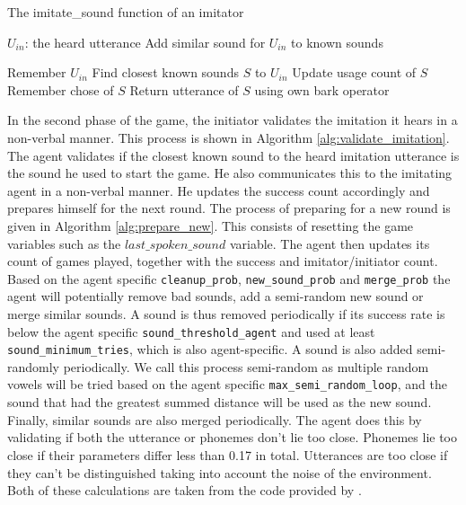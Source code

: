 
\begin{algorithm}[hbt!]
\caption{The imitate\_sound function of an imitator}\label{alg:imitate_sound}
\begin{algorithmic}
\Require $U_{in}$: the heard utterance
    \State Add similar sound for $U_{in}$ to known sounds
\EndIf

\State Remember $U_{in}$
\State Find closest known sounds $S$ to $U_{in}$
\State Update usage count of $S$
\State Remember chose of $S$
\State Return utterance of $S$ using own bark operator


\end{algorithmic}
\end{algorithm}


In the second phase of the game, the initiator validates the imitation it hears in a non-verbal manner.
This process is shown in Algorithm \ref{alg:validate_imitation}.
The agent validates if the closest known sound to the heard imitation utterance is the sound he used to start the game.
He also communicates this to the imitating agent in a non-verbal manner.
He updates the success count accordingly and prepares himself for the next round.
The process of preparing for a new round is given in Algorithm \ref{alg:prepare_new}.
This consists of resetting the game variables such as the $last\_spoken\_sound$ variable.
The agent then updates its count of games played, together with the success and imitator/initiator count.
Based on the agent specific \texttt{cleanup\_prob}, \texttt{new\_sound\_prob} and \texttt{merge\_prob} the agent will potentially remove bad sounds, add a semi-random new sound or merge similar sounds.
A sound is thus removed periodically if its success rate is below the agent specific \texttt{sound\_threshold\_agent} and used at least \texttt{sound\_minimum\_tries}, which is also agent-specific.
A sound is also added semi-randomly periodically.
We call this process semi-random as multiple random vowels will be tried based on the agent specific \texttt{max\_semi\_random\_loop}, and the sound that had the greatest summed distance will be used as the new sound.
Finally, similar sounds are also merged periodically.
The agent does this by validating if both the utterance or phonemes don't lie too close.
Phonemes lie too close if their parameters differ less than 0.17 in total.
Utterances are too close if they can't be distinguished taking into account the noise of the environment.
Both of these calculations are taken from the code provided by \citet{deBoer2000}.


